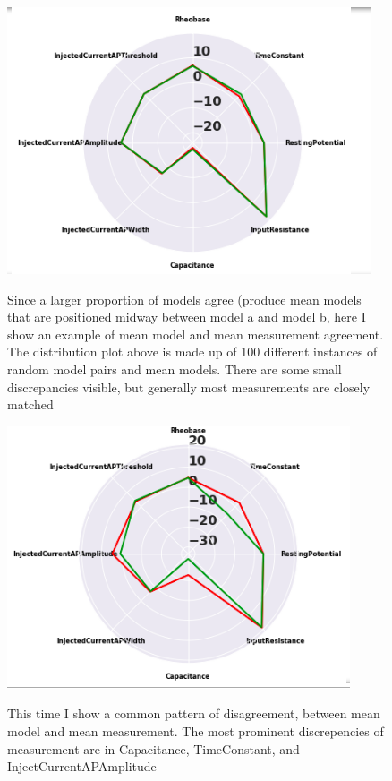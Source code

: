 \begin{figure}
    \centering
    \includegraphics{figures/model_similarities.png}
        \label{fig:mean-model-1}
    \caption[Here I plot some single instance of mean model mean measurement discrepancy]{Since a larger proportion of models agree (produce mean models that are positioned midway between model a and model b, here I show an example of mean model and mean measurement agreement. The distribution plot above is made up of 100 different instances of random model pairs and mean models. There are some small discrepancies visible, but generally most measurements are closely matched}
\end{figure}

\begin{figure}
    \centering
    \includegraphics{figures/model_differences.png}
        \label{fig:mean-model-1}
    \caption[Disparity in mean model, mean measurement agreement]{This time I show a common pattern of disagreement, between mean model and mean measurement. The most prominent discrepencies of measurement are in Capacitance, TimeConstant, and InjectCurrentAPAmplitude}
\end{figure}

